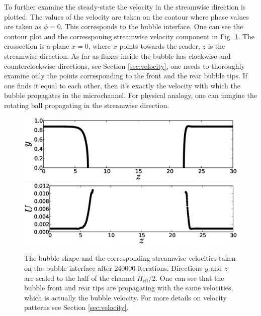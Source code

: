 \documentclass{article}
\begin{document}
To further examine the steady-state the velocity in the streamwise direction is plotted. The values
of the velocity are taken on the contour where phase values are taken as $\phi=0$. This corresponds
 to the bubble interface. One can see the contour plot and the corressponing streamwise velocity
component in Fig. \ref{fig:velocity:contour}. The crossection is a plane $x=0$, where $x$ points
towards the reader, $z$ is the streamwise direction. As far as fluxes inside the bubble has
clockwise and counterclockwise directions, see Section \ref{sec:velocity}, one needs to thoroughly
examine only the points corresponding to the front and the rear bubble tips. If one finds it equal
to each other, then it's exactly the velocity with which the bubble propagates in the microchannel.
For physical analogy, one can imagine the rotating ball propagating in the streamwise direction. 
\begin{figure}[ht]
\includegraphics[width=\textwidth]{Figures/velocity_interface_contour.eps}\\
\includegraphics[width=\textwidth]{Figures/velocity_interface_values.eps}\\
\caption{The bubble shape and the corresponding streamwise velocities taken on the bubble
interface after $240000$ iterations. Directions $y$ and $z$ are scaled to the half of the channel
$H_{\mathrm{eff}}/2$. One can see that the bubble front and rear tips are propagating with the
same velocities, which is actually the bubble velocity. For more details on velocity patterns
see Section \ref{sec:velocity}. \label{fig:velocity:contour}}
\end{figure}
\end{document}
